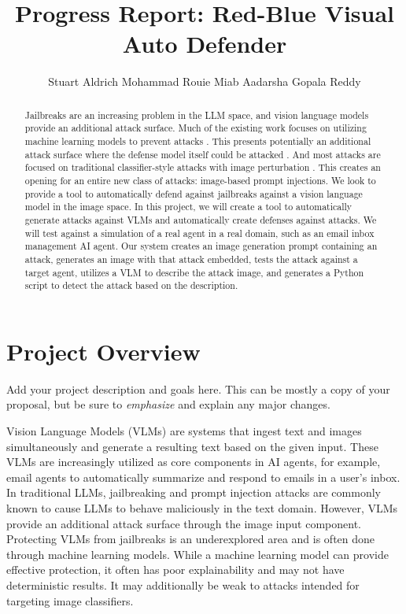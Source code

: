 \documentclass[10pt,twocolumn,letterpaper]{article}
\begin{document}
\title{Progress Report: Red-Blue Visual Auto Defender}

\author{
    Stuart Aldrich \hspace{1in} Mohammad Rouie Miab \hspace{1in} Aadarsha Gopala Reddy
}
\maketitle

\begin{abstract}
    Jailbreaks are an increasing problem in the LLM space, and vision language models provide an additional attack surface.
    Much of the existing work focuses on utilizing machine learning models to prevent attacks \cite{10657949}.
    This presents potentially an additional attack surface where the defense model itself could be attacked \cite{299563}.
    And most attacks are focused on traditional classifier-style attacks with image perturbation \cite{10.5555/3698900.3699069}.
    This creates an opening for an entire new class of attacks: image-based prompt injections.
    We look to provide a tool to automatically defend against jailbreaks against a vision language model in the image space.
    In this project, we will create a tool to automatically generate attacks against VLMs and automatically create defenses against attacks.
    We will test against a simulation of a real agent in a real domain, such as an email inbox management AI agent.
    Our system creates an image generation prompt containing an attack, generates an image with that attack embedded, tests the attack against a target agent, utilizes a VLM to describe the attack image, and generates a Python script to detect the attack based on the description.
\end{abstract}

\section{Project Overview}

Add your project description and goals here. This can be mostly a copy of your proposal, but be sure to \emph{emphasize} and explain any major changes.


Vision Language Models (VLMs) are systems that ingest text and images simultaneously and generate a resulting text based on the given input.
These VLMs are increasingly utilized as core components in AI agents, for example, email agents to automatically summarize and respond to emails in a user's inbox.
In traditional LLMs, jailbreaking and prompt injection attacks are commonly known to cause LLMs to behave maliciously in the text domain.
However, VLMs provide an additional attack surface through the image input component.
Protecting VLMs from jailbreaks is an underexplored area and is often done through machine learning models.
While a machine learning model can provide effective protection, it often has poor explainability and may not have deterministic results\cite{qi_visual_2024}\cite{ying_jailbreak_2025}.
It may additionally be weak to attacks intended for targeting image classifiers\cite{jeong_playing_2025}\cite{wang_steering_2025}.
\end{document}
